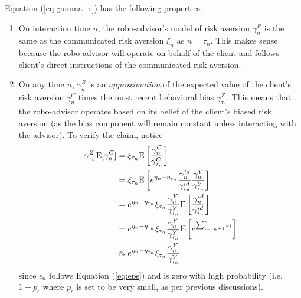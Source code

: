 Equation (\ref{eq:gamma_r}) has the following properties.\begin{enumerate}
    \item On interaction time $n$, the robo-advisor's model of risk aversion $\gamma_n^R$ is the same as the communicated risk aversion $\xi_n$ as $n=\tau_n$. This makes sense because the robo-advisor will operate on behalf of the client and follows client's direct instructions of the communicated risk aversion.
    \item On any time $n$, $\gamma_n^R$ is an \textit{approximation} of the expected value of the client's risk aversion $\gamma_n^C$ times the most recent behavioral bias $\gamma_{\tau_n}^Z$. This means that the robo-advisor operates based on its belief of the client's biased risk aversion (as the bias component will remain constant unless interacting with the advisor). To verify the claim, notice \begin{equation}\label{eq:gamma_r_approx}
        \begin{aligned}\gamma_{\tau_n}^Z\mathrm{E}[\gamma_n^C]&=\xi_{\tau_n}\mathrm{E}\left[\frac{\gamma_n^C}{\gamma_{\tau_n}^C}\right]\\
        &=\xi_{\tau_n}\mathrm{E}\left[e^{\eta_n-\eta_{\tau_n}}\frac{\gamma_n^{id}}{\gamma_{\tau_n}^{id}}\frac{\gamma_n^{Y}}{\gamma_{\tau_n}^{Y}}\right]\\
        &=e^{\eta_n-\eta_{\tau_n}}\xi_{\tau_n}\frac{\gamma_n^{Y}}{\gamma_{\tau_n}^{Y}}\mathrm{E}\left[\frac{\gamma_n^{id}}{\gamma_{\tau_n}^{id}}\right]\\
        &=e^{\eta_n-\eta_{\tau_n}}\xi_{\tau_n}\frac{\gamma_n^{Y}}{\gamma_{\tau_n}^{Y}}\mathrm{E}\left[e^{\sum_{i=\tau_n+1}^n\varepsilon_i}\right]\\
        &\approx e^{\eta_n-\eta_{\tau_n}}\xi_{\tau_n}\frac{\gamma_n^{Y}}{\gamma_{\tau_n}^{Y}}
        \end{aligned}
    \end{equation} since $\epsilon_n$ follows Equation (\ref{eq:eps}) and is zero with high probability (i.e. $1-p_\epsilon$ where $p_\epsilon$ is set to be very small, as per previous discussions).

\end{enumerate}

